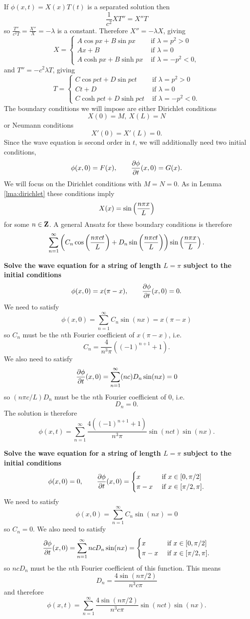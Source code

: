If $\phi(x,t)=X(x)T(t)$ is a separated solution then
\[\frac{1}{c^2}XT''=X''T\]
so $\frac{T''}{c^2T}=\frac{X''}{X}=-\lambda$ is a constant. Therefore $X''=-\lambda X$, giving
\[
X=\begin{cases}
  A\cos px+B\sin px&\mbox{ if }\lambda=p^2>0\\
  Ax+B&\mbox{ if }\lambda=0\\
  A\cosh px+B\sinh px&\mbox{ if }\lambda=-p^2<0,
\end{cases}
\]
and $T''=-c^2\lambda T$, giving
\[
T=\begin{cases}
  C\cos pct+D\sin pct&\mbox{ if }\lambda=p^2>0\\
  Ct+D&\mbox{ if }\lambda=0\\
  C\cosh pct+D\sinh pct&\mbox{ if }\lambda=-p^2<0.
\end{cases}
\]
The boundary conditions we will impose are either Dirichlet conditions
\[X(0)=M,\ X(L)=N\]
or Neumann conditions
\[X'(0)=X'(L)=0.\]
Since the wave equation is second order in $t$, we will additionally need two initial conditions,
\[\phi(x,0)=F(x),\qquad\frac{\partial \phi}{\partial t}(x,0)=G(x).\]
We will focus on the Dirichlet conditions with $M=N=0$. As in Lemma \ref{lma:dirichlet} these conditions imply
\[X(x)=\sin\left(\frac{n \pi x}{L}\right)\]
for some $n\in\mathbf{Z}$. A general Ansatz for these boundary conditions is therefore
\[\sum_{n=1}^{\infty}\left(C_n\cos\left(\frac{n\pi ct}{L}\right)+D_n\sin\left(\frac{n\pi ct}{L}\right)\right)\sin\left(\frac{n \pi x}{L}\right).\]
\begin{exm}
{\bf Solve the wave equation for a string of length $L=\pi$ subject to the initial conditions}
\[\phi(x,0)=x(\pi-x),\qquad\frac{\partial \phi}{\partial t}(x,0)=0.\]
We need to satisfy
\[\phi(x,0)=\sum_{n=1}^{\infty}C_n\sin(nx)=x(\pi-x)\]
so $C_n$ must be the $n$th Fourier coefficient of $x(\pi-x)$, i.e.
\[C_n=\frac{4}{n^3\pi}((-1)^{n+1}+1).\]
We also need to satisfy
\[\frac{\partial \phi}{\partial t}(x,0)=\sum_{n=1}^{\infty}(nc)D_n\sin(nx)=0\]
so $(n\pi c/L)D_n$ must be the $n$th Fourier coefficient of 0, i.e.
\[D_n=0.\]
The solution is therefore
\[\phi(x,t)=\sum_{n=1}^{\infty}\frac{4((-1)^{n+1}+1)}{n^3\pi}\sin(nct)\sin(nx).\]
\end{exm}

\begin{exm}
{\bf Solve the wave equation for a string of length $L=\pi$ subject to the initial conditions}
\[\phi(x,0)=0,\qquad
\frac{\partial \phi}{\partial t}(x,0)=
\begin{cases}
x&\mbox{ if }x\in[0,\pi/2]\\
\pi-x&\mbox{ if }x\in[\pi/2,\pi].
\end{cases}\]
We need to satisfy
\[\phi(x,0)=\sum_{n=1}^{\infty}C_n\sin(nx)=0\]
so $C_n=0$. We also need to satisfy
\[\frac{\partial \phi}{\partial t}(x,0)=\sum_{n=1}^{\infty}ncD_n\sin(nx)=\begin{cases}
x&\mbox{ if }x\in[0,\pi/2]\\
\pi-x&\mbox{ if }x\in[\pi/2,\pi].
\end{cases}\]
so $ncD_n$ must be the $n$th Fourier coefficient of this function. This means
\[D_n=\frac{4\sin(n\pi/2)}{n^3c\pi}\]
and therefore
\[\phi(x,t)=\sum_{n=1}^{\infty}\frac{4\sin(n\pi/2)}{n^3c\pi}\sin(nct)\sin(nx).\]
\end{exm}

